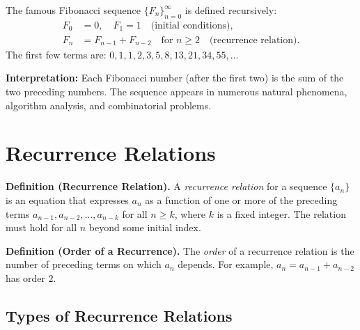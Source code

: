\documentclass[11pt,a4paper]{article}
\begin{document}
\begin{example}
The famous Fibonacci sequence $\{F_n\}_{n=0}^{\infty}$ is defined recursively:
\begin{align*}
    F_0 &= 0, \quad F_1 = 1 \quad \text{(initial conditions)}, \\
    F_n &= F_{n-1} + F_{n-2} \quad \text{for } n \geq 2 \quad \text{(recurrence relation)}.
\end{align*}
The first few terms are: $0, 1, 1, 2, 3, 5, 8, 13, 21, 34, 55, \dots$

\textbf{Interpretation:} Each Fibonacci number (after the first two) is the sum of the two preceding numbers. The sequence appears in numerous natural phenomena, algorithm analysis, and combinatorial problems.
\end{example}

\section{Recurrence Relations}

\textbf{Definition (Recurrence Relation).} A \textit{recurrence relation} for a sequence $\{a_n\}$ is an equation that expresses $a_n$ as a function of one or more of the preceding terms $a_{n-1}, a_{n-2}, \dots, a_{n-k}$ for all $n \geq k$, where $k$ is a fixed integer. The relation must hold for all $n$ beyond some initial index.

\textbf{Definition (Order of a Recurrence).} The \textit{order} of a recurrence relation is the number of preceding terms on which $a_n$ depends. For example, $a_n = a_{n-1} + a_{n-2}$ has order $2$.

\subsection{Types of Recurrence Relations}
\end{document}
